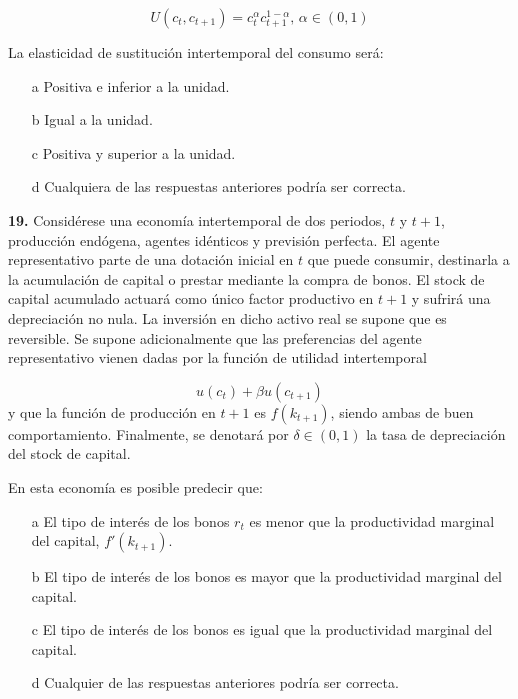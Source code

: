 \documentclass{nuevotema}
\begin{document}
\begin{equation*}
    U(c_t, c_{t+1}) = c_t^\alpha c_{t+1}^{1-\alpha}, \, \alpha \in (0,1)
\end{equation*}

La elasticidad de sustitución intertemporal del consumo será:

\begin{enumerate}
    \item[a] Positiva e inferior a la unidad.
    \item[b] Igual a la unidad.
    \item[c] Positiva y superior a la unidad.
    \item[d] Cualquiera de las respuestas anteriores podría ser correcta.
\end{enumerate}

\textbf{19.} Considérese una economía intertemporal de dos periodos, $t$ y $t+1$, producción endógena, agentes idénticos y previsión perfecta. El agente representativo parte de una dotación inicial en $t$ que puede consumir, destinarla a la acumulación de capital o prestar mediante la compra de bonos. El stock de capital acumulado actuará como único factor productivo en $t+1$ y sufrirá una depreciación no nula. La inversión en dicho activo real se supone que es reversible. Se supone adicionalmente que las preferencias del agente representativo vienen dadas por la función de utilidad intertemporal

\begin{equation*}
    u(c_t) + \beta u(c_{t+1})
\end{equation*}
y que la función de producción en $t+1$ es $f(k_{t+1})$, siendo ambas de buen comportamiento. Finalmente, se denotará por $\delta \in (0,1)$ la tasa de depreciación del stock de capital.

En esta economía es posible predecir que:

\begin{enumerate}
    \item[a] El tipo de interés de los bonos $r_t$ es menor que la productividad marginal del capital, $f'(k_{t+1})$.
    \item[b] El tipo de interés de los bonos es mayor que la productividad marginal del capital.
    \item[c] El tipo de interés de los bonos es igual que la productividad marginal del capital.
    \item[d] Cualquier de las respuestas anteriores podría ser correcta.
\end{enumerate}
\end{document}

